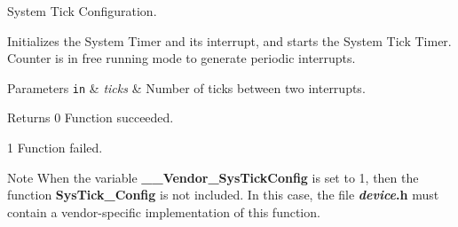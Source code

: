 System Tick Configuration. 

Initializes the System Timer and its interrupt, and starts the System Tick Timer. Counter is in free running mode to generate periodic interrupts. 
\begin{DoxyParams}[1]{Parameters}
\mbox{\tt in}  & {\em ticks} & Number of ticks between two interrupts. \\
\hline
\end{DoxyParams}
\begin{DoxyReturn}{Returns}
0 Function succeeded. 

1 Function failed. 
\end{DoxyReturn}
\begin{DoxyNote}{Note}
When the variable {\bfseries \+\_\+\+\_\+\+Vendor\+\_\+\+Sys\+Tick\+Config} is set to 1, then the function {\bfseries Sys\+Tick\+\_\+\+Config} is not included. In this case, the file {\bfseries {\itshape device}.h} must contain a vendor-\/specific implementation of this function. 
\end{DoxyNote}
